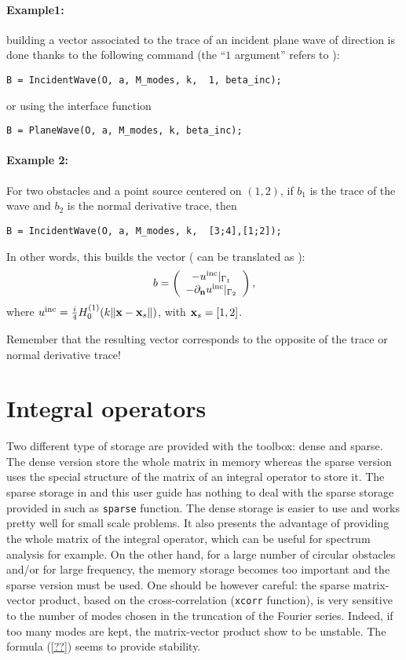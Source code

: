 \paragraph{Example1:} building a vector associated to the trace of an incident plane wave of direction  is done thanks to the following command (the ``$1$ argument'' refers to ):
\begin{verbatim}
B = IncidentWave(O, a, M_modes, k,  1, beta_inc);
\end{verbatim}
or using the interface function
\begin{verbatim}
B = PlaneWave(O, a, M_modes, k, beta_inc);
\end{verbatim}
\paragraph{Example 2:} For two obstacles and a point source centered on $(1,2)$, if $b_1$ is the trace of the wave and $b_2$ is the normal derivative trace, then
\begin{verbatim}
B = IncidentWave(O, a, M_modes, k,  [3;4],[1;2]);
\end{verbatim}
In other words, this builds the vector (\code{[3,4]} can be translated as ):
$$
b = \left(\begin{array}{c}
-u^{\textrm{inc}}|_{\Gamma_1}\\
-\partial_{\mathbf{n}}u^{\textrm{inc}}|_{\Gamma_2}\\
\end{array}\right),
$$
where $u^{\textrm{inc}} = \frac{i}{4}H_0^{(1)}(k\|{\mathbf{x}}-{\mathbf{x}}_s\|)$, with ${\mathbf{x}}_s = [1,2]$.
\begin{remark}
Remember that the resulting vector corresponds to the opposite of the trace or normal derivative trace!
\end{remark}


\section{Integral operators}

Two different type of storage are provided with the \mudiff toolbox: dense and sparse. The dense version store the whole matrix in memory whereas the sparse version uses the special structure of the matrix of an integral operator to store it. The sparse storage in \mudiff and this user guide has nothing to deal with the sparse storage provided in \matlab such as \texttt{sparse} function. The dense storage is easier to use and works pretty well for small scale problems. It also presents the advantage of providing the whole matrix of the integral operator, which can be useful for spectrum analysis for example. On the other hand, for a large number of circular obstacles and/or for large frequency, the memory storage becomes too important and the sparse version must be used. One should be however careful: the sparse matrix-vector product, based on the cross-correlation (\texttt{xcorr} \matlab function), is very sensitive to the number of modes chosen in the truncation of the Fourier series. Indeed, if too many modes are kept, the matrix-vector product show to be unstable. The formula (\ref{??}) seems to provide stability.

